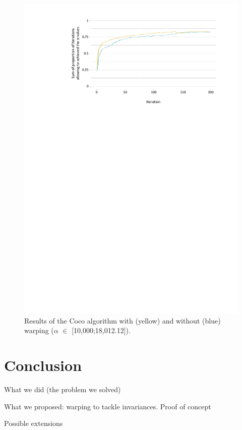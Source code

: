 	\begin{figure}[!ht]
		\centering
		\includegraphics[trim = 4cm 18.5cm 1.9cm 1.4cm, clip, width=\textwidth]{Figures_Warping_resultats_courbes_algoCoco_10000_18000.pdf}
		\caption{Results of the Coco algorithm with (yellow) and without (blue) warping ($\alpha$ $\in$ [10,000;18,012.12]).}\label{fig:algococo10000}
	\end{figure}
	
	\section{Conclusion}
	
	What we did (the problem we solved)
	
	What we proposed: warping to tackle invariances. Proof of concept
	
	Possible extensions
	
